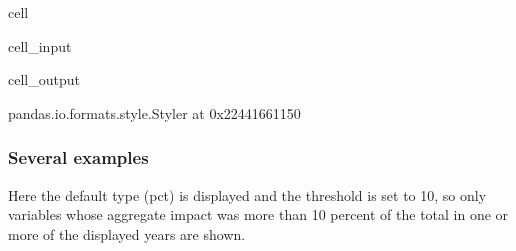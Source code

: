 \documentclass[letterpaper,10pt,english]{jupyterBook}
\begin{document}
\begin{sphinxuseclass}{cell}\begin{sphinxVerbatimInput}

\begin{sphinxuseclass}{cell_input}
\begin{sphinxVerbatim}[commandchars=\\\{\}]
\end{sphinxVerbatim}

\end{sphinxuseclass}\end{sphinxVerbatimInput}
\begin{sphinxVerbatimOutput}

\begin{sphinxuseclass}{cell_output}
\begin{sphinxVerbatim}[commandchars=\\\{\}]
\PYGZlt{}pandas.io.formats.style.Styler at 0x22441661150\PYGZgt{}
\end{sphinxVerbatim}

\end{sphinxuseclass}\end{sphinxVerbatimOutput}

\end{sphinxuseclass}

\subsubsection{Several examples}
\label{\detokenize{content/06_ModelAnalytics/AttributionSomeFeatures:several-examples}}
\sphinxAtStartPar
Here the default type (pct) is displayed and the threshold is set to 10, so only variables whose aggregate impact was more than 10 percent of the total in one or more of the displayed years are shown.
\end{document}
